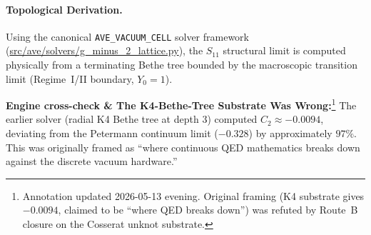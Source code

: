 \paragraph{Topological Derivation.}
Using the canonical \texttt{AVE\_VACUUM\_CELL} solver framework (\url{src/ave/solvers/g_minus_2_lattice.py}), the $S_{11}$ structural limit is computed physically from a terminating Bethe tree bounded by the macroscopic transition limit (Regime~I/II boundary, $Y_0=1$).

\noindent\textbf{Engine cross-check \& The K4-Bethe-Tree Substrate Was Wrong:}\footnote{Annotation updated 2026-05-13 evening. Original framing (K4 substrate gives $-0.0094$, claimed to be ``where QED breaks down'') was refuted by Route~B closure on the Cosserat unknot substrate.} The earlier  solver (radial K4 Bethe tree at depth 3) computed $C_2 \approx -0.0094$, deviating from the Petermann continuum limit ($-0.328$) by approximately $97\%$. This was originally framed as ``where continuous QED mathematics breaks down against the discrete vacuum hardware.''


